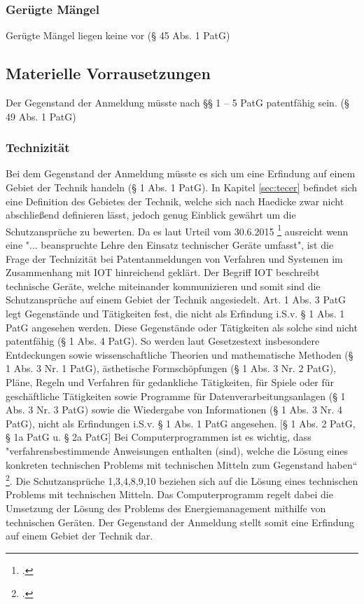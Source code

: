 \subsubsection{Gerügte Mängel}
Gerügte Mängel liegen keine vor (§ 45 Abs. 1 PatG)
\subsection{Materielle Vorrausetzungen}
Der Gegenstand der Anmeldung müsste nach §§ 1 – 5 PatG patentfähig sein. (§ 49 Abs. 1 PatG)

\subsubsection{Technizität}
Bei dem Gegenstand der Anmeldung müsste es sich um eine Erfindung auf einem Gebiet der Technik
handeln (§ 1 Abs. 1 PatG).
In Kapitel \ref{sec:tecer} befindet sich eine Definition des Gebietes 
der Technik, welche sich nach Haedicke zwar nicht abschließend definieren
lässt, jedoch genug Einblick gewährt um die Schutzansprüche zu bewerten.
Da es laut Urteil vom 30.6.2015 \footcite{BGH3020152015} ausreicht wenn 
eine "... beanspruchte Lehre den Einsatz technischer Geräte umfasst", ist
die Frage der Technizität bei Patentanmeldungen von Verfahren und 
Systemen im Zusammenhang mit IOT hinreichend geklärt.
Der Begriff IOT beschreibt technische Geräte, welche miteinander 
kommunizieren und somit sind die Schutzansprüche auf einem Gebiet der Technik
angesiedelt.
Art. 1 Abs. 3 PatG legt Gegenstände und Tätigkeiten fest, die nicht als Erfindung i.S.v. § 1 Abs. 1 PatG
angesehen werden. Diese Gegenstände oder Tätigkeiten als solche sind nicht patentfähig (§ 1 Abs. 4
PatG). So werden laut Gesetzestext insbesondere
Entdeckungen sowie wissenschaftliche Theorien und mathematische Methoden (§ 1 Abs. 3 Nr. 1
PatG),
ästhetische Formschöpfungen (§ 1 Abs. 3 Nr. 2 PatG),
Pläne, Regeln und Verfahren für gedankliche Tätigkeiten, für Spiele oder für geschäftliche Tätigkeiten
sowie Programme für Datenverarbeitungsanlagen (§ 1 Abs. 3 Nr. 3 PatG) sowie
die Wiedergabe von Informationen (§ 1 Abs. 3 Nr. 4 PatG),
nicht als Erfindungen i.S.v. § 1 Abs. 1 PatG angesehen.
[§ 1 Abs. 2 PatG, § 1a PatG u. § 2a PatG]
Bei Computerprogrammen ist es wichtig, dass 
"verfahrensbestimmende Anweisungen enthalten (sind), welche die Lösung eines konkreten
technischen Problems mit technischen Mitteln zum Gegenstand haben“ \footcite{BGH2020092009}.
Die Schutzansprüche 1,3,4,8,9,10 beziehen sich auf die Lösung eines technischen Problems
mit technischen Mitteln. Das Computerprogramm regelt dabei die Umsetzung der 
Lösung des Problems des Energiemanagement mithilfe von technischen Geräten.
Der Gegenstand der Anmeldung stellt somit eine Erfindung auf einem Gebiet der Technik dar.



